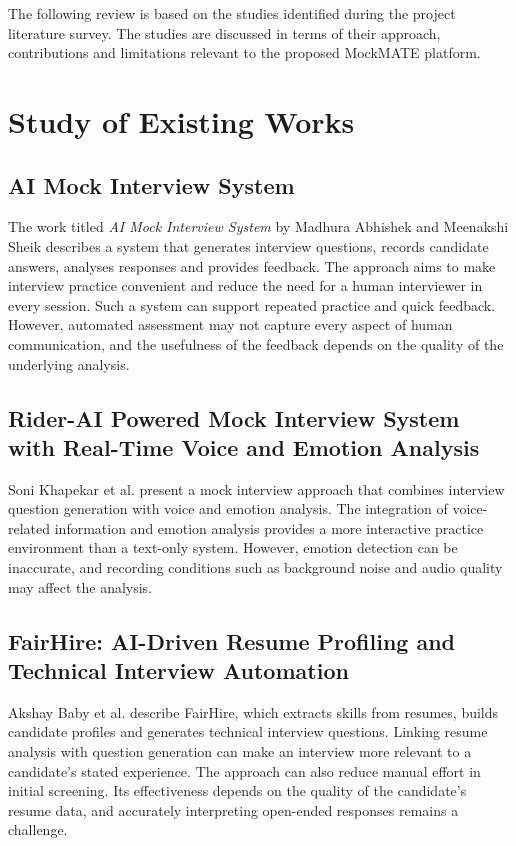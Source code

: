 \documentclass[12pt,a4paper,oneside]{report}
\begin{document}
The following review is based on the studies identified during the project literature survey. The studies are discussed in terms of their approach, contributions and limitations relevant to the proposed MockMATE platform.

\section{Study of Existing Works}

\subsection{AI Mock Interview System}
The work titled \emph{AI Mock Interview System} by Madhura Abhishek and Meenakshi Sheik describes a system that generates interview questions, records candidate answers, analyses responses and provides feedback. The approach aims to make interview practice convenient and reduce the need for a human interviewer in every session. Such a system can support repeated practice and quick feedback. However, automated assessment may not capture every aspect of human communication, and the usefulness of the feedback depends on the quality of the underlying analysis.

\subsection{Rider-AI Powered Mock Interview System with Real-Time Voice and Emotion Analysis}
Soni Khapekar et al. present a mock interview approach that combines interview question generation with voice and emotion analysis. The integration of voice-related information and emotion analysis provides a more interactive practice environment than a text-only system. However, emotion detection can be inaccurate, and recording conditions such as background noise and audio quality may affect the analysis.

\subsection{FairHire: AI-Driven Resume Profiling and Technical Interview Automation}
Akshay Baby et al. describe FairHire, which extracts skills from resumes, builds candidate profiles and generates technical interview questions. Linking resume analysis with question generation can make an interview more relevant to a candidate's stated experience. The approach can also reduce manual effort in initial screening. Its effectiveness depends on the quality of the candidate's resume data, and accurately interpreting open-ended responses remains a challenge.
\end{document}
